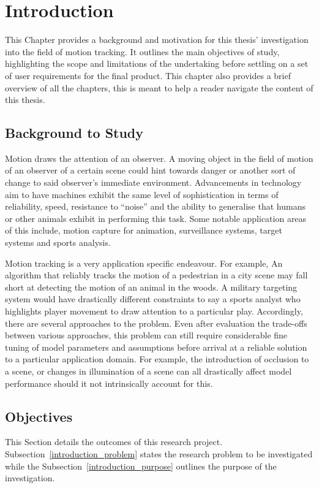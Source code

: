 \chapter{Introduction}\label{chapter_introduction}
This Chapter provides a background and motivation for this thesis' investigation
into the field of motion tracking. It outlines the main objectives of study,
highlighting the scope and limitations of the undertaking before settling on a
set of user requirements for the final product.  This chapter also provides a
brief overview of all the chapters, this is meant
to help a reader navigate the content of this thesis.

\section{Background to Study}
Motion draws the attention of an observer. A moving object in the field of
motion of an observer of a certain scene could hint towards danger or another
sort of change to said observer's immediate environment. Advancements in
technology aim to have machines exhibit the same level of sophistication in terms of
reliability, speed, resistance to ``noise'' and the ability to generalise that
humans or other animals exhibit in performing this task. Some notable
application areas of this include, motion capture for animation, surveillance
systems, target systems and sports analysis.

Motion tracking is a very application specific endeavour. For example, An
algorithm that reliably tracks the motion of a pedestrian in a city scene may fall
short at detecting the motion of an animal in the woods. A military targeting
system would have drastically different constraints to say a sports analyst
who highlights player movement to draw attention to a particular play.
Accordingly, there are several approaches to the problem. Even after evaluation
the trade-offs between various approaches, this problem can still require
considerable fine tuning of model parameters and assumptions before arrival at a
reliable solution to a particular application domain. 
For example, the introduction of occlusion to a scene, or changes in
illumination of a scene can all drastically affect model performance should it
not intrinsically account for this. 

\section{Objectives}\label{introduction_objectives}
This Section details the outcomes of this research project.
Subsection~\ref{introduction_problem} states the research problem to be
investigated while the Subsection~\ref{introduction_purpose} outlines the
purpose of the investigation.

